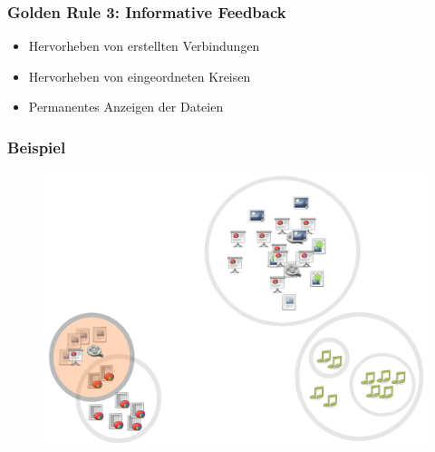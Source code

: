 \begin{frame}

\frametitle{Golden Rule 3: Informative Feedback}
\label{goldenrule3:informativefeedback}

\begin{itemize}
\item Hervorheben von erstellten Verbindungen

\item Hervorheben von eingeordneten Kreisen

\item Permanentes Anzeigen der Dateien

\end{itemize}

\end{frame}

\begin{frame}

\frametitle{Beispiel}
\label{beispiel}

\begin{figure}[htbp]
\centering
\includegraphics[keepaspectratio,width=\textwidth,height=0.75\textheight]{02.png}
\label{}
\end{figure}


\end{frame}

